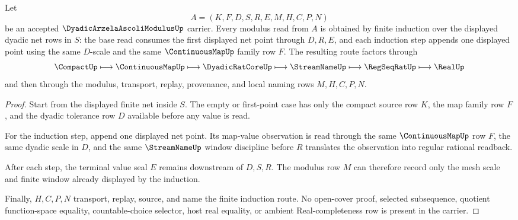 \begin{theorem}
\label{thm:dyadic-arzela-ascoli-modulus-finite-net-induction}
Let
$$
A=(K,F,D,S,R,E,M,H,C,P,N)
$$
be an accepted $\DyadicArzelaAscoliModulusUp$ carrier. Every modulus read from $A$ is obtained by finite induction over the displayed dyadic net rows in $S$: the base read consumes the first displayed net point through $D,R,E$, and each induction step appends one displayed point using the same $D$-scale and the same $\ContinuousMapUp$ family row $F$. The resulting route factors through
$$
\CompactUp \longmapsto \ContinuousMapUp \longmapsto \DyadicRatCoreUp \longmapsto \StreamNameUp \longmapsto \RegSeqRatUp \longmapsto \RealUp
$$
and then through the modulus, transport, replay, provenance, and local naming rows $M,H,C,P,N$.
\end{theorem}
\begin{proof}
Start from the displayed finite net inside $S$. The empty or first-point case has only the compact source row $K$, the map family row $F$, and the dyadic tolerance row $D$ available before any value is read.

For the induction step, append one displayed net point. Its map-value observation is read through the same $\ContinuousMapUp$ row $F$, the same dyadic scale in $D$, and the same $\StreamNameUp$ window discipline before $R$ translates the observation into regular rational readback.

After each step, the terminal value seal $E$ remains downstream of $D,S,R$. The modulus row $M$ can therefore record only the mesh scale and finite window already displayed by the induction.

Finally, $H,C,P,N$ transport, replay, source, and name the finite induction route. No open-cover proof, selected subsequence, quotient function-space equality, countable-choice selector, host real equality, or ambient Real-completeness row is present in the carrier.
\end{proof}


